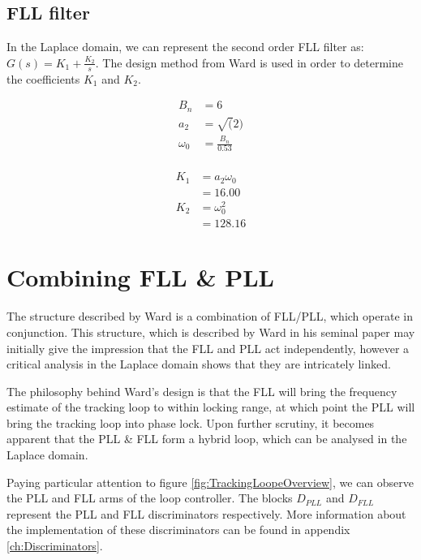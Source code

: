 \subsection{\ac{FLL} filter}
In the Laplace domain, we can represent the second order \ac{FLL} filter as:  $G(s) = K_1 + \frac{K_2}{s}$. The design method from Ward \cite{Ward} is used in order to determine the coefficients $K_1$ and $K_2$.  

\begin{align*}
B_n &= 6\\
a_2 &= \sqrt(2)\\
\omega_{0}&=\frac{B_n}{0.53}\\
\end{align*}

\begin{align*}
K_1 & = a_2 \omega_{0}\\
    & = 16.00\\
K_2 & = \omega_{0}^2\\
    & = 128.16
\end{align*}

\clearpage

\section{Combining FLL \& PLL}

The structure described by Ward is a combination of FLL/PLL, which operate in conjunction. This structure, which is described by Ward in his seminal paper  may initially give the impression that the FLL and PLL act independently, however a critical analysis in the Laplace domain shows that they are intricately linked\cite{Ward}.

The philosophy behind Ward's design is that the FLL will bring the frequency estimate of the tracking loop to within locking range, at which point the PLL will bring the tracking loop into phase lock. Upon further scrutiny, it becomes apparent that the PLL \& FLL form a hybrid loop, which can be analysed in the Laplace domain.


Paying particular attention to figure \ref{fig:TrackingLoopeOverview}, we can observe the PLL and FLL arms of the loop controller. The blocks $D_{PLL}$ and $D_{FLL}$ represent the PLL and FLL discriminators respectively. More information about the implementation of these discriminators can be found in appendix \ref{ch:Discriminators}. 



